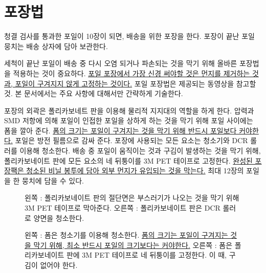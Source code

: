 \section{포장법}
청결 검사를 통과한 포일이 10장이 되면, 배송을 위한 포장을 한다. 포장이 끝난 포일 뭉치는 배송 상자에 담아 보관한다. 

세척이 끝난 포일이 배송 중 다시 오염 되거나 파손되는 것을 막기 위해 올바른 포장법을 적용하는 것이 중요하다. \uline{포일 포장에서 가장 신경 써야할 것은 먼지를 제거하는 것과, 포일이 구겨지지 않게 고정하는 것이다.} 포일 포장법은 제공되는 동영상을 참고할 것. 본 문서에서는 주요 사항에 대해서만 간략하게 기술한다.

포장의 외곽은 폴리카보네트 판을 이용해 물리적 지지대의 역할을 하게 한다. 압력과 SMD 저항에 의해 포일이 인접한 포일을 상하게 하는 것을 막기 위해 포일 사이에는 폼을 깔아 준다. \uline{폼의 크기는 포일이 구겨지는 것을 막기 위해 반드시 포일보다 커야한다.} 포일은 방전 필름으로 감싸 준다. 포장에 사용되는 모든 요소는 청소기와 DCR 롤러를 이용해 청소한다. 배송 중 포일이 움직이는 것과 구김이 발생하는 것을 막기 위해, 폴리카보네이트 판에 모든 요소의 네 뒤퉁이를 3M PET 테이프로 고정한다. \uline{완성된 포장팩은 청소된 비닐 봉투에 담아 외부 먼지가 유입되는 것을 막는다.} 최대 12장의 포일을 한 뭉치에 담을 수 있다.

\begin{figure}[htb]
  \centering
  \caption[폴리카보네이트 판의 절단면 처리]{왼쪽 : 폴리카보네이트 판의 절단면은 부스러기가 나오는 것을 막기 위해 3M PET 테이프로 막아준다. 오른쪽 : 폴리카보네이트 판은 DCR 롤러로 양면을 청소한다.}
  \label{fig:polycarbonate}
\end{figure}

\begin{figure}[htb]
  \centering
  \caption[폼의 처리]{왼쪽 : 폼은 청소기를 이용해 청소한다. \uline{폼의 크기는 포일이 구겨지는 것을 막기 위해, 최소 반드시 포일의 크기보다는 커야한다.} 오른쪽 : 폼은 폴리카보네이트 판에 3M PET 테이프로 네 뒤퉁이를 고정한다. 이 때, 구김이 없어야 한다.}
  \label{fig:foam}
\end{figure}

